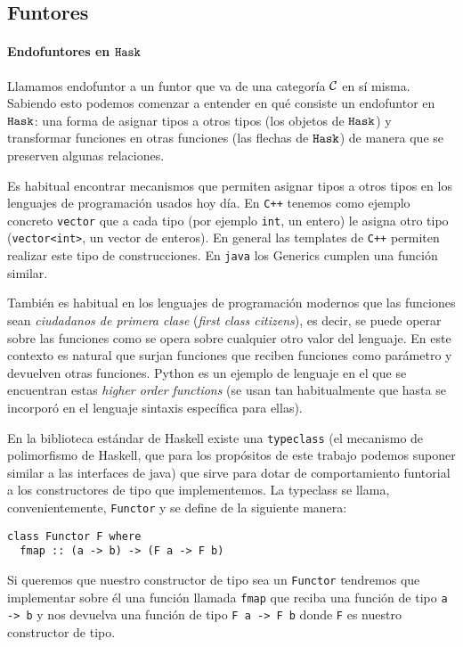 \subsection{Funtores}
\paragraph{Endofuntores en $\texttt{Hask}$}
Llamamos endofuntor a un funtor que va de una categoría $\mathcal{C}$ en sí misma.
Sabiendo esto podemos comenzar a entender en qué consiste un endofuntor
en $\texttt{Hask}$: una forma de asignar tipos a otros tipos (los objetos
de $\texttt{Hask}$) y transformar funciones en otras funciones (las flechas
de $\texttt{Hask}$) de manera que se preserven algunas relaciones.

Es habitual encontrar mecanismos que permiten asignar tipos a otros tipos
en los lenguajes de programación usados hoy día. En \verb~C++~
tenemos como ejemplo concreto \verb~vector~ que a cada tipo
(por ejemplo \verb~int~, un entero)
le asigna otro tipo (\verb~vector<int>~, un vector de enteros). En
general las templates de \texttt{C++} permiten realizar este tipo de
construcciones. En \verb~java~ los Generics cumplen una función similar.

También es habitual en los lenguajes de programación modernos
que las funciones
sean \textit{ciudadanos de primera clase} (\textit{first class citizens}),
es decir, se puede operar sobre las funciones como se opera sobre
cualquier otro valor del lenguaje. En este contexto es natural que
surjan funciones que reciben funciones como parámetro y devuelven
otras funciones. Python es un ejemplo de lenguaje en el que
se encuentran estas \textit{higher order functions} (se usan
tan habitualmente que hasta se incorporó en el
lenguaje sintaxis específica para ellas).

En la biblioteca estándar de Haskell existe una \verb~typeclass~
(el mecanismo de polimorfismo de Haskell, que para los propósitos
de este trabajo podemos suponer similar a las interfaces de java)
que sirve para dotar de comportamiento funtorial a los constructores
de tipo que implementemos. La typeclass
se llama, convenientemente, \verb~Functor~ y se
define de la siguiente manera:

\begin{verbatim}
class Functor F where
  fmap :: (a -> b) -> (F a -> F b)
\end{verbatim}

Si queremos que nuestro constructor de tipo
sea un \verb~Functor~ tendremos
que implementar sobre él una función llamada \verb~fmap~ que reciba
una función de tipo \verb~a -> b~ y nos devuelva una función
de tipo \verb~F a -> F b~ donde \verb~F~ es nuestro constructor de tipo.

